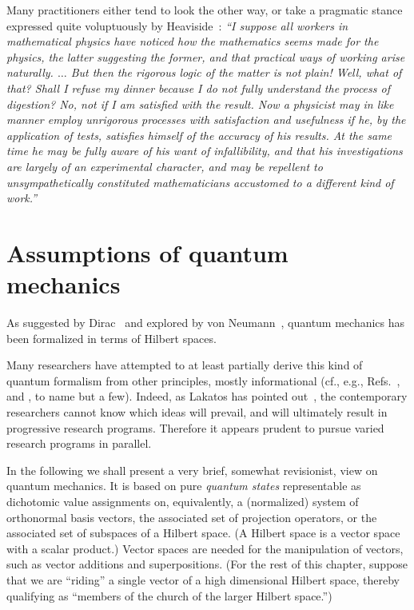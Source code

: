 Many practitioners either tend to look the other way, or take a pragmatic stance expressed quite voluptuously by
Heaviside~\cite[\S~225]{heaviside-EMT}:
{\em
``I suppose all workers
in mathematical physics have noticed how the mathematics
seems made for the physics, the latter suggesting the former, and
that practical ways of working arise naturally. $\ldots$ But then the
rigorous logic of the matter is not plain! Well, what of that?
Shall I refuse my dinner because I do not fully understand the
process of digestion? No, not if I am satisfied with the result.
Now a physicist may in like manner employ unrigorous processes with satisfaction and usefulness if he, by the application
of tests, satisfies himself of the accuracy of his results. At
the same time he may be fully aware of his want of infallibility,
and that his investigations are largely of an experimental character, and may be repellent to unsympathetically
constituted mathematicians accustomed to a different kind
of work.''
}





\section{Assumptions of quantum mechanics}

As suggested by Dirac~\cite{dirac} and explored by von Neumann~\cite{v-neumann-49,v-neumann-55},
quantum mechanics has been formalized in terms of Hilbert spaces.

Many researchers have attempted to at least partially derive this kind of quantum formalism from other principles,
mostly informational (cf., e.g., Refs.~\cite{wheeler-89,zeil-99}, and \cite[Part~II]{Chiribella-Spekkens-2016}, to name but a few).
Indeed, as Lakatos has pointed out~\cite{lakatosch},
the contemporary researchers cannot know which ideas will prevail, and will ultimately result in progressive research programs.
Therefore it appears prudent to pursue varied research programs in parallel.


In the following we shall present a very brief, somewhat revisionist, view on quantum mechanics.
It is based on pure {\em quantum states} representable as dichotomic value assignments on, equivalently, a (normalized) system of orthonormal basis  vectors,
the associated set of projection operators, or the associated set of subspaces of a Hilbert space. (A Hilbert space is a vector space with a scalar product.)
Vector spaces are needed for the manipulation of vectors, such as vector additions and superpositions.
(For the rest of this chapter, suppose that we are ``riding'' a single vector of a high dimensional Hilbert space,
thereby qualifying as ``members of the church of the larger Hilbert space.'')

